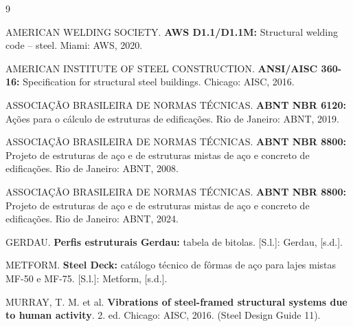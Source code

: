 \documentclass[11pt,a4paper]{article}
\begin{document}
\begin{thebibliography}{9}

AMERICAN WELDING SOCIETY. \textbf{AWS D1.1/D1.1M:} Structural welding code -- steel. Miami: AWS, 2020.

AMERICAN INSTITUTE OF STEEL CONSTRUCTION. \textbf{ANSI/AISC 360-16:} Specification for structural steel buildings. Chicago: AISC, 2016.

ASSOCIAÇÃO BRASILEIRA DE NORMAS TÉCNICAS. \textbf{ABNT NBR 6120:} Ações para o cálculo de estruturas de edificações. Rio de Janeiro: ABNT, 2019.

ASSOCIAÇÃO BRASILEIRA DE NORMAS TÉCNICAS. \textbf{ABNT NBR 8800:} Projeto de estruturas de aço e de estruturas mistas de aço e concreto de edificações. Rio de Janeiro: ABNT, 2008.

ASSOCIAÇÃO BRASILEIRA DE NORMAS TÉCNICAS. \textbf{ABNT NBR 8800:} Projeto de estruturas de aço e de estruturas mistas de aço e concreto de edificações. Rio de Janeiro: ABNT, 2024.

GERDAU. \textbf{Perfis estruturais Gerdau:} tabela de bitolas. [S.l.]: Gerdau, [s.d.].

METFORM. \textbf{Steel Deck:} catálogo técnico de fôrmas de aço para lajes mistas MF-50 e MF-75. [S.l.]: Metform, [s.d.].

MURRAY, T. M. et al. \textbf{Vibrations of steel-framed structural systems due to human activity}. 2. ed. Chicago: AISC, 2016. (Steel Design Guide 11).

\end{thebibliography}
\end{document}
